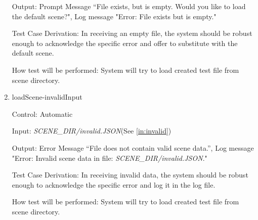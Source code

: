 \documentclass[12pt, titlepage]{article}
\begin{document}
\begin{enumerate}
Output: Prompt Message ``File exists, but is empty. Would you like to load the 
default scene?", Log message "Error: File exists but is empty."

Test Case Derivation: In receiving an empty file, the system should be robust 
enough to acknowledge the specific error and offer to substitute with the 
default scene.

How test will be performed: System will try to load created test file from 
scene directory.

\item{loadScene-invalidInput\\}

Control: Automatic

Input: \textit{SCENE\_DIR/invalid.JSON}(See \ref{in:invalid})

Output: Error Message ``File does not contain valid scene data.'', Log message 
"Error: Invalid scene data in file: \textit{SCENE\_DIR/invalid.JSON}."

Test Case Derivation: In receiving invalid data, the system should be robust 
enough to acknowledge the specific error and log it in the log file.

How test will be performed: System will try to load created test file from 
scene directory. 

\end{enumerate}
\end{document}
